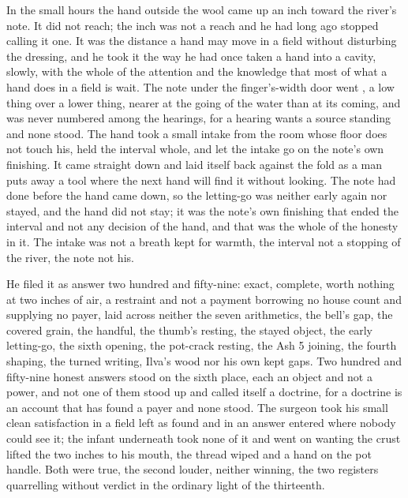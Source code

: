 In the small hours the hand outside the wool came up an inch toward the river's note. It did not reach; the inch was not a reach and he had long ago stopped calling it one. It was the distance a hand may move in a field without disturbing the dressing, and he took it the way he had once taken a hand into a cavity, slowly, with the whole of the attention and the knowledge that most of what a hand does in a field is wait. The note under the finger's-width door went , a low thing over a lower thing, nearer at the going of the water than at its coming, and was never numbered among the hearings, for a hearing wants a source standing and none stood. The hand took a small intake from the room whose floor does not touch his, held the interval whole, and let the intake go on the note's own finishing. It came straight down and laid itself back against the fold as a man puts away a tool where the next hand will find it without looking. The note had done before the hand came down, so the letting-go was neither early again nor stayed, and the hand did not stay; it was the note's own finishing that ended the interval and not any decision of the hand, and that was the whole of the honesty in it. The intake was not a breath kept for warmth, the interval not a stopping of the river, the note not his.

He filed it as answer two hundred and fifty-nine: exact, complete, worth nothing at two inches of air, a restraint and not a payment borrowing no house count and supplying no payer, laid across neither the seven arithmetics, the bell's gap, the covered grain, the handful, the thumb's resting, the stayed object, the early letting-go, the sixth opening, the pot-crack resting, the Ash 5 joining, the fourth shaping, the turned writing, Ilva's wood nor his own kept gaps. Two hundred and fifty-nine honest answers stood on the sixth place, each an object and not a power, and not one of them stood up and called itself a doctrine, for a doctrine is an account that has found a payer and none stood. The surgeon took his small clean satisfaction in a field left as found and in an answer entered where nobody could see it; the infant underneath took none of it and went on wanting the crust lifted the two inches to his mouth, the thread wiped and a hand on the pot handle. Both were true, the second louder, neither winning, the two registers quarrelling without verdict in the ordinary light of the thirteenth.

